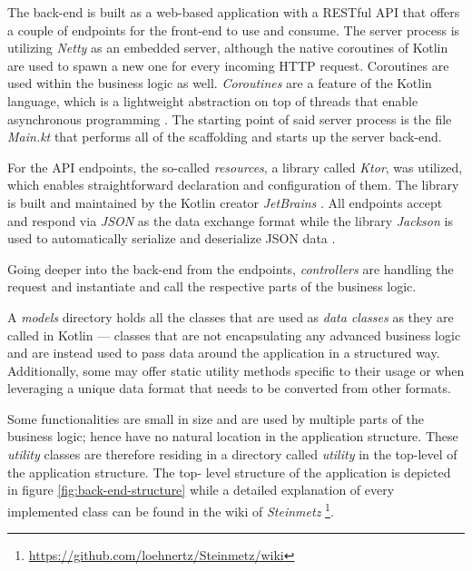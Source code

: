 \documentclass[12pt,a4paper]{report}
\begin{document}
The back-end is built as a web-based application with a RESTful API that offers
a couple of endpoints for the front-end to use and consume. The server process
is utilizing \textit{Netty} \cite{ktor-netty} as an embedded server, although
the native coroutines of Kotlin are used to spawn a new one for every incoming
HTTP request. Coroutines are used within the business logic as
well. \textit{Coroutines} are a feature of the Kotlin language, which is a
lightweight abstraction on top of threads that enable asynchronous programming
\cite{kotlin-coroutines}. The starting point of said server process is the file
\textit{Main.kt} that performs all of the scaffolding and starts up the server
back-end.

For the API endpoints, the so-called \textit{resources}, a library called
\textit{Ktor}, was utilized, which enables straightforward declaration and
configuration of them. The library is built and maintained by the Kotlin
creator \textit{JetBrains} \cite{ktor}. All endpoints accept and respond via
\textit{JSON} as the data exchange format while the library \textit{Jackson} is
used to automatically serialize and deserialize JSON data \cite{ktor-jackson}.

Going deeper into the back-end from the endpoints, \textit{controllers} are
handling the request and instantiate and call the respective parts of the
business logic.

A \textit{models} directory holds all the classes that are used as
\textit{data classes} as they are called in Kotlin --- classes that are not
encapsulating any advanced business logic and are instead used to pass data
around the application in a structured way. Additionally, some may offer static
utility methods specific to their usage or when leveraging a unique data format
that needs to be converted from other formats.

Some functionalities are small in size and are used by multiple parts
of the business logic; hence have no natural location in the application
structure. These \textit{utility} classes are therefore residing in a directory
called \textit{utility} in the top-level of the application structure. The top-
level structure of the application is depicted in figure
\ref{fig:back-end-structure} while a detailed explanation of every implemented
class can be found in the wiki of \textit{Steinmetz}
\footnote{\url{https://github.com/loehnertz/Steinmetz/wiki}}.
\end{document}
